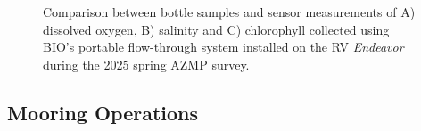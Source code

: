 \documentclass[12pt]{article}\usepackage[]{graphicx}\usepackage[]{color}
\begin{document}
\begin{figure}[htb]

{\centering {} 

}

\caption{Comparison between bottle samples and sensor measurements of A) dissolved oxygen, B) salinity and C) chlorophyll collected using BIO's portable flow-through system installed on the RV \emph{Endeavor} during the 2025 spring AZMP survey.}\label{fig:figure6}
\end{figure}
\clearpage

\subsection{Mooring Operations}\label{mooring-operations}
\end{document}
